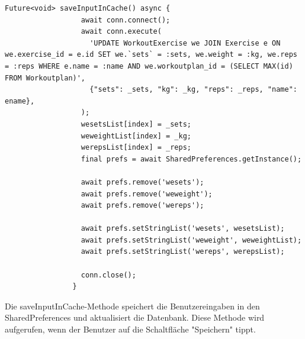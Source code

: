         \begin{lstlisting}[caption=Bearbeiten saveInputInCache,label=lst:impl:frontend:qrcode]
            Future<void> saveInputInCache() async {
                  await conn.connect();
                  await conn.execute(
                    'UPDATE WorkoutExercise we JOIN Exercise e ON we.exercise_id = e.id SET we.`sets` = :sets, we.weight = :kg, we.reps = :reps WHERE e.name = :name AND we.workoutplan_id = (SELECT MAX(id) FROM Workoutplan)',
                    {"sets": _sets, "kg": _kg, "reps": _reps, "name": ename},
                  );
                  wesetsList[index] = _sets;
                  weweightList[index] = _kg;
                  werepsList[index] = _reps;
                  final prefs = await SharedPreferences.getInstance();
            
                  await prefs.remove('wesets');
                  await prefs.remove('weweight');
                  await prefs.remove('wereps');
            
                  await prefs.setStringList('wesets', wesetsList);
                  await prefs.setStringList('weweight', weweightList);
                  await prefs.setStringList('wereps', werepsList);
            
                  conn.close();
                }
        \end{lstlisting}
        
        Die saveInputInCache-Methode speichert die Benutzereingaben in den SharedPreferences und aktualisiert die Datenbank. Diese Methode wird aufgerufen, wenn der Benutzer auf die Schaltfläche "Speichern" tippt.